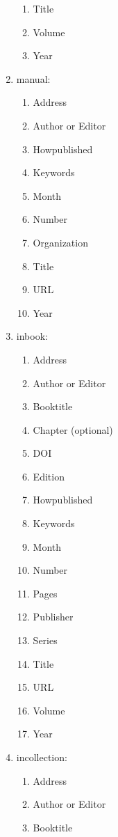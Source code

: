 \documentclass[letter,12pt]{article}
\begin{document}
\begin{enumerate}
\begin{enumerate}
	\item Title
	\item Volume
	\item Year
	\end{enumerate}
\item manual: \vspace{-0.3cm}
	\begin{enumerate} \itemsep -2pt
	\item Address
	\item Author or Editor
	\item Howpublished
	\item Keywords
	\item Month
	\item Number
	\item Organization
	\item Title
	\item URL
	\item Year
	\end{enumerate}
\item inbook: \vspace{-0.3cm}
	\begin{enumerate} \itemsep -2pt
	\item Address
	\item Author or Editor
	\item Booktitle
	\item Chapter (optional)
	\item DOI
	\item Edition
	\item Howpublished
	\item Keywords
	\item Month
	\item Number
	\item Pages
	\item Publisher
	\item Series
	\item Title
	\item URL
	\item Volume
	\item Year
	\end{enumerate}
\item incollection: \vspace{-0.3cm}
	\begin{enumerate} \itemsep -2pt
	\item Address
	\item Author or Editor
	\item Booktitle

\end{enumerate}
\end{enumerate}
\end{document}

